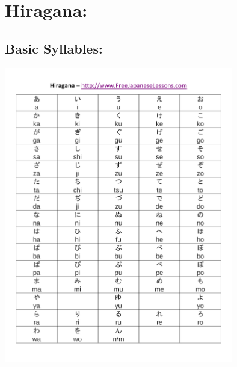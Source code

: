 \documentclass[12pt, letterpaper]{report}
\begin{document}
\section{Hiragana:}
\subsection{Basic Syllables:}

\includegraphics[width=0.75\textwidth]{printable-hiragana-chart}
\end{document}
